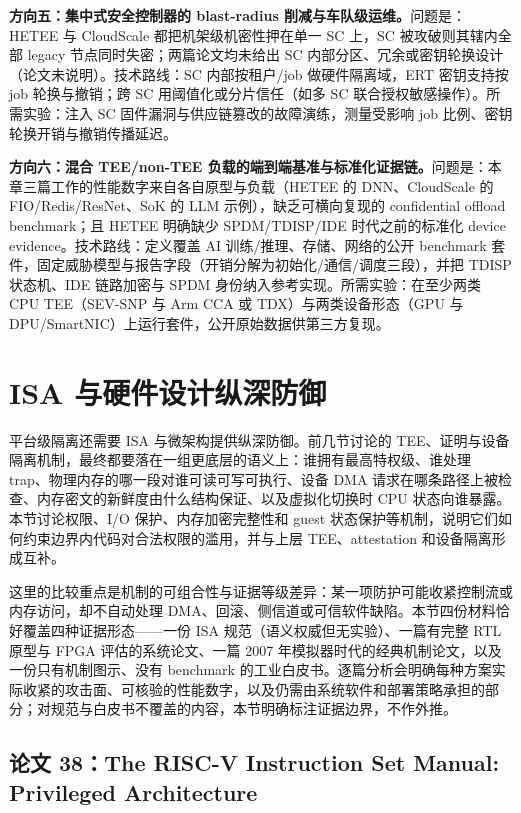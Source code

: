 \documentclass[11pt]{ctexart}
\begin{document}
\noindent\textbf{方向五：集中式安全控制器的 blast-radius 削减与车队级运维。}问题是：HETEE 与 CloudScale 都把机架级机密性押在单一 SC 上，SC 被攻破则其辖内全部 legacy 节点同时失密；两篇论文均未给出 SC 内部分区、冗余或密钥轮换设计（论文未说明）\cite{zhu2020hetee,dhar2024cloudscale}。技术路线：SC 内部按租户/job 做硬件隔离域，ERT 密钥支持按 job 轮换与撤销；跨 SC 用阈值化或分片信任（如多 SC 联合授权敏感操作）。所需实验：注入 SC 固件漏洞与供应链篡改的故障演练，测量受影响 job 比例、密钥轮换开销与撤销传播延迟。\par
\noindent\textbf{方向六：混合 TEE/non-TEE 负载的端到端基准与标准化证据链。}问题是：本章三篇工作的性能数字来自各自原型与负载（HETEE 的 DNN、CloudScale 的 FIO/Redis/ResNet、SoK 的 LLM 示例），缺乏可横向复现的 confidential offload benchmark；且 HETEE 明确缺少 SPDM/TDISP/IDE 时代之前的标准化 device evidence\cite{zhu2020hetee}。技术路线：定义覆盖 AI 训练/推理、存储、网络的公开 benchmark 套件，固定威胁模型与报告字段（开销分解为初始化/通信/调度三段），并把 TDISP 状态机、IDE 链路加密与 SPDM 身份纳入参考实现。所需实验：在至少两类 CPU TEE（SEV-SNP 与 Arm CCA 或 TDX）与两类设备形态（GPU 与 DPU/SmartNIC）上运行套件，公开原始数据供第三方复现。\par
\section{ISA 与硬件设计纵深防御}
平台级隔离还需要 ISA 与微架构提供纵深防御。前几节讨论的 TEE、证明与设备隔离机制，最终都要落在一组更底层的语义上：谁拥有最高特权级、谁处理 trap、物理内存的哪一段对谁可读可写可执行、设备 DMA 请求在哪条路径上被检查、内存密文的新鲜度由什么结构保证、以及虚拟化切换时 CPU 状态向谁暴露。本节讨论权限、I/O 保护、内存加密完整性和 guest 状态保护等机制，说明它们如何约束边界内代码对合法权限的滥用，并与上层 TEE、attestation 和设备隔离形成互补。\par
这里的比较重点是机制的可组合性与证据等级差异：某一项防护可能收紧控制流或内存访问，却不自动处理 DMA、回滚、侧信道或可信软件缺陷。本节四份材料恰好覆盖四种证据形态——一份 ISA 规范（语义权威但无实验）、一篇有完整 RTL 原型与 FPGA 评估的系统论文、一篇 2007 年模拟器时代的经典机制论文，以及一份只有机制图示、没有 benchmark 的工业白皮书。逐篇分析会明确每种方案实际收紧的攻击面、可核验的性能数字，以及仍需由系统软件和部署策略承担的部分；对规范与白皮书不覆盖的内容，本节明确标注证据边界，不作外推。\par
\subsection{论文 38：The RISC-V Instruction Set Manual: Privileged Architecture}
\end{document}
